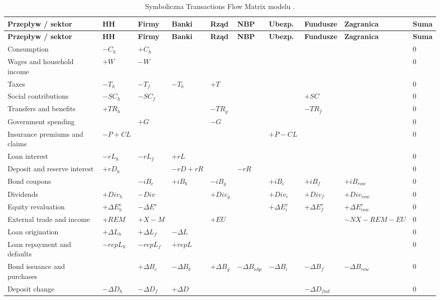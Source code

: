 \begin{landscape}
\scriptsize
\begin{longtable}{@{}L{3.5cm}*{9}{C{1.45cm}}@{}}
\caption{Symboliczna Transactions Flow Matrix modelu \amor{}.}
\label{tab:appendix-tfm}\\
\toprule
\textbf{Przepływ / sektor} & \textbf{HH} & \textbf{Firmy} & \textbf{Banki} & \textbf{Rząd} & \textbf{NBP} & \textbf{Ubezp.} & \textbf{Fundusze} & \textbf{Zagranica} & \textbf{Suma} \\
\midrule
\endfirsthead
\toprule
\textbf{Przepływ / sektor} & \textbf{HH} & \textbf{Firmy} & \textbf{Banki} & \textbf{Rząd} & \textbf{NBP} & \textbf{Ubezp.} & \textbf{Fundusze} & \textbf{Zagranica} & \textbf{Suma} \\
\midrule
\endhead
Consumption & $-C_h$ & $+C_h$ &  &  &  &  &  &  & $0$ \\
Wages and household income & $+W$ & $-W$ &  &  &  &  &  &  & $0$ \\
Taxes & $-T_h$ & $-T_f$ & $-T_b$ & $+T$ &  &  &  &  & $0$ \\
Social contributions & $-SC_h$ & $-SC_f$ &  &  &  &  & $+SC$ &  & $0$ \\
Transfers and benefits & $+TR_h$ &  &  & $-TR_g$ &  &  & $-TR_f$ &  & $0$ \\
Government spending &  & $+G$ &  & $-G$ &  &  &  &  & $0$ \\
Insurance premiums and claims & $-P+CL$ &  &  &  &  & $+P-CL$ &  &  & $0$ \\
Loan interest & $-rL_h$ & $-rL_f$ & $+rL$ &  &  &  &  &  & $0$ \\
Deposit and reserve interest & $+rD_h$ &  & $-rD+rR$ &  & $-rR$ &  &  &  & $0$ \\
Bond coupons &  & $-iB_c$ & $+iB_b$ & $-iB_g$ &  & $+iB_i$ & $+iB_f$ & $+iB_{row}$ & $0$ \\
Dividends & $+Div_h$ & $-Div$ &  & $+Div_g$ &  & $+Div_i$ & $+Div_f$ & $+Div_{row}$ & $0$ \\
Equity revaluation & $+\Delta E_h^v$ & $-\Delta E^v$ &  &  &  & $+\Delta E_i^v$ & $+\Delta E_f^v$ & $+\Delta E_{row}^v$ & $0$ \\
External trade and income & $+REM$ & $+X-M$ &  & $+EU$ &  &  &  & $-NX-REM-EU$ & $0$ \\
Loan origination & $+\Delta L_h$ & $+\Delta L_f$ & $-\Delta L$ &  &  &  &  &  & $0$ \\
Loan repayment and defaults & $-repL_h$ & $-repL_f$ & $+repL$ &  &  &  &  &  & $0$ \\
Bond issuance and purchases &  & $+\Delta B_c$ & $-\Delta B_b$ & $+\Delta B_g$ & $-\Delta B_{nbp}$ & $-\Delta B_i$ & $-\Delta B_f$ & $-\Delta B_{row}$ & $0$ \\
Deposit change & $-\Delta D_h$ & $-\Delta D_f$ & $+\Delta D$ &  &  &  & $-\Delta D_{fnd}$ &  & $0$ \\
\bottomrule
\end{longtable}
\end{landscape}

